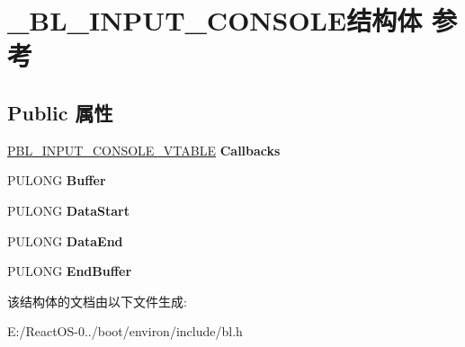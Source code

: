 \hypertarget{struct___b_l___i_n_p_u_t___c_o_n_s_o_l_e}{}\section{\+\_\+\+B\+L\+\_\+\+I\+N\+P\+U\+T\+\_\+\+C\+O\+N\+S\+O\+L\+E结构体 参考}
\label{struct___b_l___i_n_p_u_t___c_o_n_s_o_l_e}
\subsection*{Public 属性}
\begin{DoxyCompactItemize}
\item 
\mbox{\label{struct___b_l___i_n_p_u_t___c_o_n_s_o_l_e_ac36754907f44b162ffe462a743107871}} 
\hyperlink{struct___b_l___i_n_p_u_t___c_o_n_s_o_l_e___v_t_a_b_l_e}{P\+B\+L\+\_\+\+I\+N\+P\+U\+T\+\_\+\+C\+O\+N\+S\+O\+L\+E\+\_\+\+V\+T\+A\+B\+LE} {\bfseries Callbacks}
\item 
\mbox{\label{struct___b_l___i_n_p_u_t___c_o_n_s_o_l_e_a200314bd4eb571e2f681aaf2e152dc9a}} 
P\+U\+L\+O\+NG {\bfseries Buffer}
\item 
\mbox{\label{struct___b_l___i_n_p_u_t___c_o_n_s_o_l_e_a2fdbdfe7b089562653a7a596d09b0145}} 
P\+U\+L\+O\+NG {\bfseries Data\+Start}
\item 
\mbox{\label{struct___b_l___i_n_p_u_t___c_o_n_s_o_l_e_adc3179e16809ca00b616553fe49adbba}} 
P\+U\+L\+O\+NG {\bfseries Data\+End}
\item 
\mbox{\label{struct___b_l___i_n_p_u_t___c_o_n_s_o_l_e_a2ae73b5421dfa151dbc5c29f33566a4a}} 
P\+U\+L\+O\+NG {\bfseries End\+Buffer}
\end{DoxyCompactItemize}


该结构体的文档由以下文件生成\+:\begin{DoxyCompactItemize}
\item 
E\+:/\+React\+O\+S-\/0../boot/environ/include/bl.\+h\end{DoxyCompactItemize}

